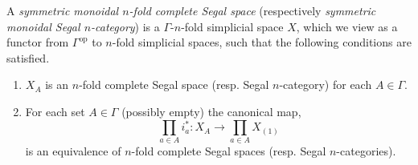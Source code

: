 \documentclass{amsart}
\begin{document}
\begin{definition}
	A {\em symmetric monoidal $n$-fold complete Segal space} (respectively {\em symmetric monoidal Segal $n$-category}) is a $\Gamma$-$n$-fold simplicial space $X$, which we view as a functor from $\Gamma^\textrm{op}$ to $n$-fold simplicial spaces, such that the following conditions are satisfied. 
	\begin{enumerate}
		\item $X_A$ is an $n$-fold complete Segal space (resp. Segal $n$-category) for each $A \in \Gamma$. 
		\item For each set $A \in \Gamma$ (possibly empty) the canonical map,
		\begin{equation*}
			\prod_{a \in A} i_a^*: X_A \to \prod_{a \in A} X_{(1)}
		\end{equation*}
		is an equivalence of $n$-fold complete Segal spaces (resp. Segal $n$-categories). 
	\end{enumerate}
\end{definition}
\end{document}
